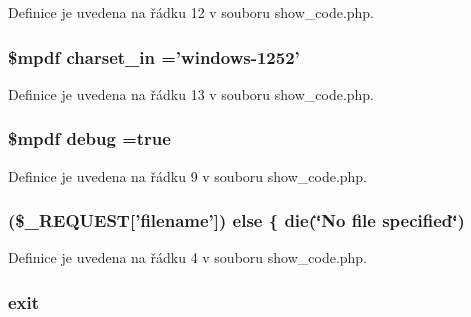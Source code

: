 Definice je uvedena na řádku 12 v souboru show\-\_\-code.\-php.

\hypertarget{show__code_8php_a2ee5c294694d309db57ff7d247030461}{
\subsubsection[{charset\-\_\-in}]{\setlength{\rightskip}{0pt plus 5cm}\$mpdf charset\-\_\-in ='windows-\/1252'}}\label{show__code_8php_a2ee5c294694d309db57ff7d247030461}


Definice je uvedena na řádku 13 v souboru show\-\_\-code.\-php.

\hypertarget{show__code_8php_a200a436f1833a712239f1ae5bec608db}{
\subsubsection[{debug}]{\setlength{\rightskip}{0pt plus 5cm}\$mpdf debug =true}}\label{show__code_8php_a200a436f1833a712239f1ae5bec608db}


Definice je uvedena na řádku 9 v souboru show\-\_\-code.\-php.

\hypertarget{show__code_8php_a3c8ec87efb7bfeaea8b9ec9c7c3ef10f}{
\subsubsection[{else}]{ (\$\-\_\-\-R\-E\-Q\-U\-E\-S\-T\mbox{[}'filename'\mbox{]}) else \{ die(\char`\"{}No file specified\char`\"{})}}\label{show__code_8php_a3c8ec87efb7bfeaea8b9ec9c7c3ef10f}


Definice je uvedena na řádku 4 v souboru show\-\_\-code.\-php.

\hypertarget{show__code_8php_a6733eb5f605d09eaede9845835d71c4e}{
\subsubsection[{exit}]{\setlength{\rightskip}{0pt plus 5cm}exit}}\label{show__code_8php_a6733eb5f605d09eaede9845835d71c4e}


